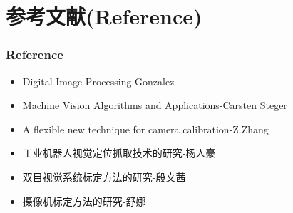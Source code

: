 \documentclass[aspectratio=43]{beamer}
\begin{document}
	\section{参考文献(Reference)}
	
		\begin{frame}
			\frametitle{Reference}
			\begin{itemize}
				\item Digital Image Processing-Gonzalez
				\item Machine Vision Algorithms and Applications-Carsten Steger
				\item A flexible new technique for camera calibration-Z.Zhang
				\item 工业机器人视觉定位抓取技术的研究-杨人豪
				\item 双目视觉系统标定方法的研究-殷文茜
				\item 摄像机标定方法的研究-舒娜
			\end{itemize}
		\end{frame}
	
\end{document}
